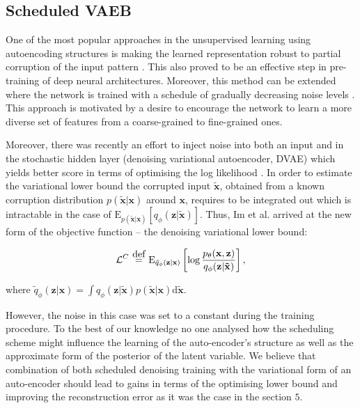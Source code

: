 \documentclass[../report.tex]{subfiles}
\begin{document}
\subsection{Scheduled VAEB}
One of the most popular approaches in the unsupervised learning using autoencoding structures is making the learned representation robust to partial corruption of the input pattern \cite{vincentDAE}. This also proved to be an effective step in pre-training of deep neural architectures. Moreover, this method can be extended where the network is trained with a schedule of gradually decreasing noise levels \cite{sutton}.  This approach is motivated by a desire to encourage the network to learn a more diverse set of features from a coarse-grained to fine-grained ones.

Moreover, there was recently an effort to inject noise into both an input and in the stochastic hidden layer (denoising variational autoencoder, DVAE) which yields better score in terms of optimising the log likelihood \cite{bengioDVAE}. In order to estimate the variational lower bound the corrupted input $\mathbf{\widetilde{x}}$,  obtained from a known corruption distribution $p (\mathbf{\widetilde{x}} | \mathbf{x})$ around $\mathbf{x}$, requires to be integrated out which is intractable in the case of $\text{E}_{p (\mathbf{\widetilde{x}} | \mathbf{x})} \left[ q_{\phi}(\mathbf{z} | \mathbf{\widetilde{x}} )\right]$. Thus, Im et al. arrived at the new form of the objective function -- the denoising variational lower bound:

$$\mathcal{L}^{C} ~ \myeq ~ \text{E}_{\tilde{q}_\phi (\mathbf{z} | \mathbf{x})} \left[ 
\log \frac{p_{\theta} (\mathbf{x, z})}{q_\phi (\mathbf{z} | \mathbf{\tilde{x}})}
\right], $$

where $\tilde{q}_\phi (\mathbf{z} | \mathbf{x}) = \int q_\phi (\mathbf{z}| \mathbf{\tilde{x}}) p(\mathbf{\tilde{x}} | \mathbf{x}) \text{d}\mathbf{\tilde{x}}$. 

However, the noise in this case was set to a constant during the training procedure. To the best of our knowledge no one analysed how the scheduling scheme might influence the learning of the auto-encoder's structure as well as the approximate form of the posterior of the latent variable. We believe that combination of both scheduled denoising training with the variational form of an auto-encoder should lead to gains in terms of the optimising lower bound and improving the reconstruction error as it was the case in the section $5$.
\end{document}
